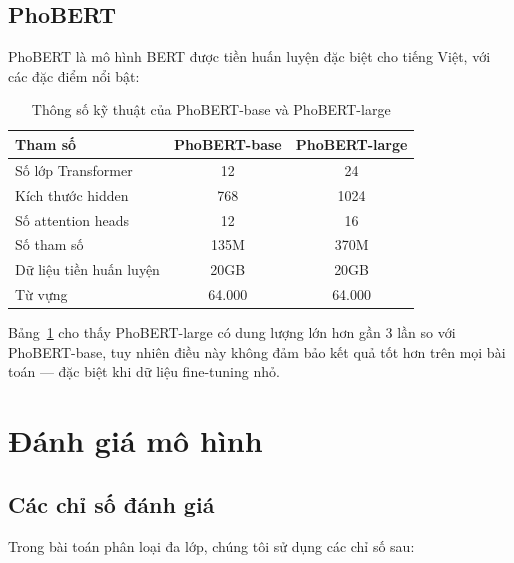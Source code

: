 \documentclass[12pt, a4paper]{report}
\begin{document}
\subsection{PhoBERT}

PhoBERT \cite{Le2024bert} là mô hình BERT được tiền huấn luyện đặc biệt
cho tiếng Việt, với các đặc điểm nổi bật:

\begin{table}[htbp]
  \centering
  \caption{Thông số kỹ thuật của PhoBERT-base và PhoBERT-large}
  \label{tab:phobert}
  \begin{tabular}{lcc}
    \toprule
    Tham số & PhoBERT-base & PhoBERT-large \\
    \midrule
    Số lớp Transformer        & 12     & 24 \\
    Kích thước hidden          & 768    & 1024 \\
    Số attention heads         & 12     & 16 \\
    Số tham số                 & 135M   & 370M \\
    Dữ liệu tiền huấn luyện    & 20GB   & 20GB \\
    Từ vựng                    & 64.000 & 64.000 \\
    \bottomrule
  \end{tabular}
\end{table}

Bảng~\ref{tab:phobert} cho thấy PhoBERT-large có dung lượng lớn hơn
gần 3 lần so với PhoBERT-base, tuy nhiên điều này không đảm bảo kết quả
tốt hơn trên mọi bài toán --- đặc biệt khi dữ liệu fine-tuning nhỏ.

\section{Đánh giá mô hình}
\label{sec:evaluation}

\subsection{Các chỉ số đánh giá}

Trong bài toán phân loại đa lớp, chúng tôi sử dụng các chỉ số sau:
\end{document}
